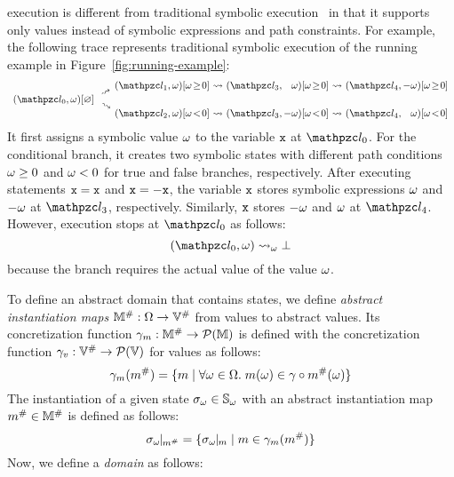 {\Sealed} execution is different from traditional
symbolic execution~\cite{symbolic} in that it supports only {\sealed}
values instead of symbolic expressions and path constraints.  For example, the
following trace represents traditional symbolic execution of the running
example in Figure~\ref{fig:running-example}:
{
\small
\[
  \begin{array}{r@{~}c@{~}c@{~}c@{~}r@{~}c@{~}r}
    &&(\lab_1, \symb)[\symb \!\geq\! 0]
    &\trans& (\lab_3, \phantom{-}\symb)[\symb \!\geq\! 0]
    &\trans& (\lab_4, -\symb)[\symb \!\geq\! 0]
    \vspace*{-0.5em}\\
    &\rutrans&
    \vspace*{-0.5em}\\
    (\lab_0, \symb)[\varnothing]
    \vspace*{-0.5em}\\
    &\rdtrans&
    \vspace*{-0.5em}\\
    &&(\lab_2, \symb)[\symb \!<\! 0]
    &\trans& (\lab_3, -\symb)[\symb \!<\! 0]
    &\trans& (\lab_4, \phantom{-}\symb)[\symb \!<\! 0]\\
  \end{array}
\]
}
It first assigns a symbolic value $\omega$ to the variable $\texttt{x}$ at $\lab_0$.
For the conditional branch, it creates two symbolic states with
different path conditions $\omega \geq 0$ and $\omega < 0$ for true and false
branches, respectively.  After executing statements $\texttt{x} = \texttt{x}$ and $\texttt{x} =
-\texttt{x}$, the variable $\texttt{x}$ stores symbolic expressions $\omega$ and $-\omega$
at $\lab_3$, respectively. Similarly, $\texttt{x}$  stores $-\omega$ and $\omega$ at $\lab_4$.
However, {\sealed} execution stops at $\lab_0$ as follows:
\[
  (\lab_0, \symb) \; \symbtrans \; \excst
\]
because the branch requires the actual value of the {\sealed} value $\omega$.

To define an abstract domain that contains {\sealed} states, we define
\textit{abstract instantiation maps} ${\mathbb{M}}^{\#}: \Omega \rightarrow
{\mathbb{V}}^{\#}$ from {\sealed} values to abstract values.  Its concretization
function $\gamma_m: {\mathbb{M}}^{\#} \rightarrow \mathcal{P}(\mathbb{M})$ is defined
with the concretization function $\gamma_v: {\mathbb{V}}^{\#} \rightarrow
\mathcal{P}(\mathbb{V})$ for values as follows:
\[
  \gamma_m({m}^{\#}) = \{
    m \mid \forall \omega \in \Omega. \;
    m(\omega) \in \gamma \circ {m}^{\#}(\omega)
  \}
\]
The instantiation of a given {\sealed} state ${\sigma}_\omega \in {\mathbb{S}}_\omega$ with
an abstract instantiation map ${m}^{\#} \in {\mathbb{M}}^{\#}$ is defined as follows:
\[
  \instant{\symbst}{\absimap} = \{ \instant{\symbst}{\imap} \mid \imap \in
  \imapgamma(\absimap) \}
\]
Now, we define a \textit{{\sealed} domain} as follows:


